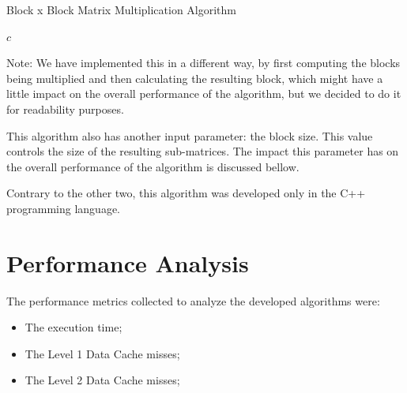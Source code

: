 \documentclass[11pt,a4paper]{article}
\begin{document}
\begin{algorithm}[H]
\caption{Block x Block Matrix Multiplication Algorithm}
\begin{algorithmic}[1]
                            \EndFor
                        \EndFor
                    \EndFor
                \EndFor
            \EndFor
        \EndFor
        \State \Return $c$
    \EndFunction
\end{algorithmic}
\end{algorithm}

Note: We have implemented this in a different way, by first computing the blocks being multiplied and then calculating the resulting block, which might have a little impact on the overall performance of the algorithm, but we decided to do it for readability purposes.

This algorithm also has another input parameter: the block size. This value controls the size of the resulting sub-matrices. The impact this parameter has on the overall performance of the algorithm is discussed bellow.

Contrary to the other two, this algorithm was developed only in the C++ programming language.

\section{Performance Analysis}

The performance metrics collected to analyze the developed algorithms were:

\begin{itemize}
    \item The execution time;
    \item The Level 1 Data Cache misses;
    \item The Level 2 Data Cache misses;
\end{itemize}
\end{document}
